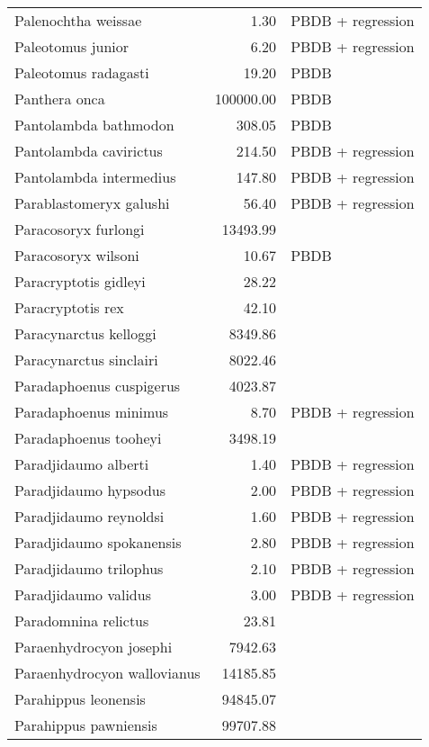 \begin{table}[ht]
\begin{tabular}{lrl}
  Palenochtha weissae & 1.30 & PBDB + regression \\ 
  Paleotomus junior & 6.20 & PBDB + regression \\ 
  Paleotomus radagasti & 19.20 & PBDB \\ 
  Panthera onca & 100000.00 & PBDB \\ 
  Pantolambda bathmodon & 308.05 & PBDB \\ 
  Pantolambda cavirictus & 214.50 & PBDB + regression \\ 
  Pantolambda intermedius & 147.80 & PBDB + regression \\ 
  Parablastomeryx galushi & 56.40 & PBDB + regression \\ 
  Paracosoryx furlongi & 13493.99 & \cite{Tomiya2013} \\ 
  Paracosoryx wilsoni & 10.67 & PBDB \\ 
  Paracryptotis gidleyi & 28.22 & \cite{Tomiya2013} \\ 
  Paracryptotis rex & 42.10 & \cite{Tomiya2013} \\ 
  Paracynarctus kelloggi & 8349.86 & \cite{Tomiya2013} \\ 
  Paracynarctus sinclairi & 8022.46 & \cite{Tomiya2013} \\ 
  Paradaphoenus cuspigerus & 4023.87 & \cite{Tomiya2013} \\ 
  Paradaphoenus minimus & 8.70 & PBDB + regression \\ 
  Paradaphoenus tooheyi & 3498.19 & \cite{Tomiya2013} \\ 
  Paradjidaumo alberti & 1.40 & PBDB + regression \\ 
  Paradjidaumo hypsodus & 2.00 & PBDB + regression \\ 
  Paradjidaumo reynoldsi & 1.60 & PBDB + regression \\ 
  Paradjidaumo spokanensis & 2.80 & PBDB + regression \\ 
  Paradjidaumo trilophus & 2.10 & PBDB + regression \\ 
  Paradjidaumo validus & 3.00 & PBDB + regression \\ 
  Paradomnina relictus & 23.81 & \cite{Tomiya2013} \\ 
  Paraenhydrocyon josephi & 7942.63 & \cite{Tomiya2013} \\ 
  Paraenhydrocyon wallovianus & 14185.85 & \cite{Tomiya2013} \\ 
  Parahippus leonensis & 94845.07 & \cite{Tomiya2013} \\ 
  Parahippus pawniensis & 99707.88 & \cite{Tomiya2013} \\ 

\end{tabular}
\end{table}

